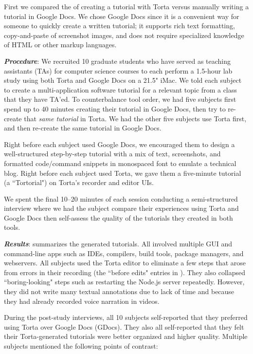 First we compared the  of creating a tutorial with Torta
versus manually writing a tutorial in Google Docs. We chose Google Docs
since it is a convenient way for someone to quickly create a written tutorial; it
supports rich text formatting, copy-and-paste of screenshot images, and
does not require specialized knowledge of HTML or other markup
languages. 

\emph{\textbf{Procedure}}: We recruited 10 graduate students who have
served as teaching assistants (TAs) for computer science courses to each
perform a 1.5-hour lab study using both Torta and Google Docs on a 21.5"
iMac. We told each subject to create a multi-application software
tutorial for a relevant topic from a class that they have TA'ed. To
counterbalance tool order, we had five subjects first spend up to 40 minutes
creating their tutorial in Google Docs, then try to
re-create that \emph{same tutorial} in Torta. We had the other five
subjects use Torta first, and then re-create the same tutorial in Google
Docs.

Right before each subject used Google Docs, we encouraged them to design a
well-structured step-by-step tutorial with a mix of text, screenshots,
and formatted code/command snippets in monospaced font to emulate a
technical blog. Right before each subject used Torta, we gave
them a five-minute tutorial (a ``Tortorial") on Torta's recorder and
editor UIs.

We spent the final 10--20 minutes of each session conducting a
semi-structured interview where we had the subject compare their
experiences using Torta and Google Docs then self-assess the quality of
the tutorials they created in both tools.


\emph{\textbf{Results}}:  summarizes the
generated tutorials. All involved multiple GUI and command-line apps
such as IDEs, compilers, build tools, package managers, and webservers.
%
All subjects used the Torta editor to eliminate a few steps that arose
from errors in their recording (the ``before edits" entries in
). They also collapsed ``boring-looking" steps
such as restarting the Node.js server repeatedly. However, they did not
write many textual annotations due to lack of time and because they
had already recorded voice narration in videos.

During the post-study interviews, all
10 subjects self-reported that they preferred using Torta over Google
Docs (GDocs). They also all
self-reported that they felt their Torta-generated tutorials were better organized
and higher quality. Multiple subjects mentioned the following points of
contrast:

